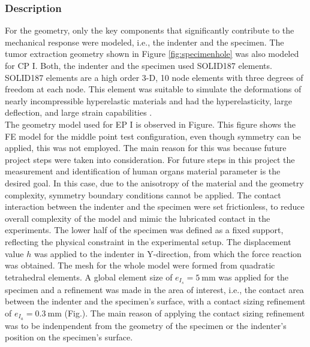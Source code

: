\subsubsection*{Description}

For the geometry, only the key components that significantly contribute to the mechanical response were modeled, 
i.e., the indenter and the specimen. The tumor extraction geometry shown in Figure \ref{fig:specimenhole}
was also modeled for CP I. Both, the indenter and the specimen used SOLID187 elements. 
SOLID187 elements are a high order 3-D, 10 node elements with three degrees of freedom at each node. 
This element was suitable to simulate the deformations of nearly incompressible hyperelastic materials 
and had the hyperelasticity, large deflection, and large strain capabilities \cite{Ansys2010}.\\
The geometry model used for EP I is observed in Figure. %
This figure shows the FE model for the middle point test configuration, even though symmetry can be applied, this was 
not employed. The main reason for this was because future project steps were taken into consideration. 
For future steps in this project the measurement and identification of human organs material parameter 
is the desired goal. In this case, due to the anisotropy of the material and the geometry complexity,
symmetry boundary conditions cannot be applied. 
The contact interaction between the indenter and the specimen were set frictionless, to reduce 
overall complexity of the model and mimic the lubricated contact in the experiments.
The lower half of the specimen was defined as a fixed support, reflecting the physical constraint in the 
experimental setup. The displacement value $h$ was applied to the indenter in Y-direction, 
from which the force reaction was obtained.
The mesh for the whole model were formed from quadratic tetrahedral elements. 
A global element size of $e_{I_s}=\SI{5}{\milli\meter}$ was applied for the specimen and 
a refinement was made in the area of interest, i.e., the contact 
area between the indenter and the specimen's surface, with a contact sizing refinement of  
$e_{I_a}=\SI{0.3}{\milli\meter}$ (Fig.). %
The main reason of applying the contact sizing refinement was to be indenpendent from the geometry 
of the specimen or the indenter's position on the specimen's surface.

